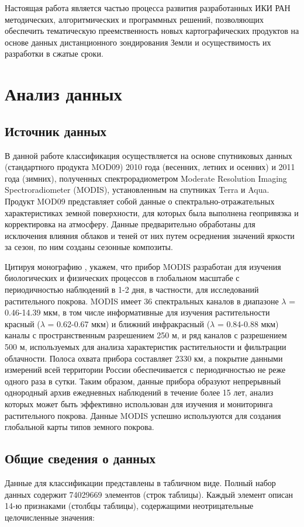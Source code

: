 \documentclass[14pt, a4paper, oneside]{extarticle}
\begin{document}
Настоящая работа является частью процесса развития разработанных ИКИ РАН методических, алгоритмических и программных решений, позволяющих обеспечить тематическую преемственность новых картографических продуктов на основе данных дистанционного зондирования Земли и осуществимость их разработки в сжатые сроки.

\newpage

\section{Анализ данных}
\subsection{Источник данных}
В данной работе классификация осуществляется на основе спутниковых данных (стандартного продукта MOD09) 2010 года (весенних, летних и осенних) и 2011 года (зимних), полученных спектрорадиометром Moderate Resolution Imaging Spectroradiometer (MODIS), установленным на спутниках Terra и Aqua. Продукт MOD09 представляет собой данные о спектрально-отражательных характеристиках земной поверхности, для которых была выполнена геопривязка и корректировка на атмосферу. Данные предварительно обработаны для исключения влияния облаков и теней от них путем осреднения значений яркости за сезон, по ним созданы сезонные композиты.

Цитируя монографию \cite{land-cover-mapping-monograph}, укажем, что прибор MODIS разработан для изучения биологических и физических процессов в глобальном масштабе с периодичностью наблюдений в 1-2 дня, в частности, для исследований растительного покрова. MODIS имеет 36 спектральных каналов в диапазоне $\lambda$ = 0.46-14.39 мкм, в том числе информативные для изучения растительности красный ($\lambda$ = 0.62-0.67 мкм) и ближний инфракрасный ($\lambda$ = 0.84-0.88 мкм) каналы с пространственным разрешением 250 м, и ряд каналов с разрешением 500 м, используемых для анализа характеристик растительности и фильтрации облачности. Полоса охвата прибора составляет 2330 км, а покрытие данными измерений всей территории России обеспечивается с периодичностью не реже одного раза в сутки. Таким образом, данные прибора образуют непрерывный однородный архив ежедневных наблюдений в течение более 15 лет, анализ которых может быть эффективно использован для изучения и мониторинга растительного покрова. Данные MODIS успешно используются для создания глобальной карты типов земного покрова.

\subsection{Общие сведения о данных}
Данные для классификации представлены в табличном виде. Полный набор данных содержит 74029669 элементов (строк таблицы). Каждый элемент описан 14-ю признаками (столбцы таблицы), содержащими неотрицательные целочисленные значения:
\end{document}

